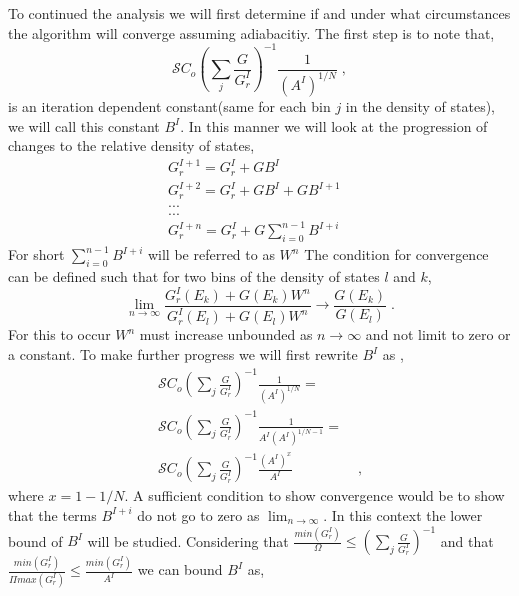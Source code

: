 \documentclass[aps,pre,reprint,superscriptaddress,showkeys]{revtex4-1}
\begin{document}
To continued the analysis we will first determine if and under what circumstances the algorithm will converge assuming adiabacitiy. The first step is to note that, 
\begin{equation}
\mathcal{S}{C_o}(\sum_{j}\frac{G}{G_r^I})^{-1}\frac{1}{(A^I)^{1/N}} \;,
\end{equation}
is an iteration dependent constant(same  for each bin $j$ in the density of states), we will call this constant $B^I$. In this manner we will look at the progression of changes to the relative density of states, 
\begin{equation}
\begin{split}
G_r^{I+1} = G_r^{I} + GB^I\\
G_r^{I+2} = G_r^{I} + GB^I + GB^{I+1} &\\
...&\\
...&\\
G_r^{I+n} = G_r^{I} + G\sum_{i=0}^{n-1}  B^{I+i} &
\end{split}
\label{Gr_IplusN}
\end{equation}
For short $\sum_{i=0}^{n-1}  B^{I+i}$ will be referred to as $W^n$
The condition for convergence can be defined such that for two bins of the density of states $l$ and $k$, 
\begin{equation}
\lim_{n\rightarrow \infty} \frac{G_r^{I}(E_k) + G(E_k)W^n}{G_r^{I}(E_l) + G(E_l)W^n} \rightarrow \frac{G(E_k)}{G(E_l)}\;.
\end{equation}
For this to occur $W^n$ must increase unbounded as $n\rightarrow \infty$ and not limit to zero or a constant. To make further progress we will first rewrite $B^I$ as , 
\begin{equation}
\begin{split}
\mathcal{S}{C_o}(\sum_{j}\frac{G}{G_r^{I}})^{-1}\frac{1}{(A^I)^{1/N}} = \\
\mathcal{S}{C_o}(\sum_{j}\frac{G}{G_r^{I}})^{-1}\frac{1}{A^I(A^I)^{1/N - 1}} = & \\
\mathcal{S}{C_o}(\sum_{j}\frac{G}{G_r^{I}})^{-1}\frac{(A^I)^{x}}{A^I} & \;,
\end{split}
\end{equation}
where $x = 1 - 1/N$. A sufficient condition to show convergence would be to show that the terms $B^{I+i}$ do not go to zero as $\lim_{n \rightarrow \infty}$. In this context the lower bound of $B^I$ will be studied. Considering that $ \frac{min(G_r^{I})}{\Omega} \le (\sum_{j}\frac{G}{G_r^{I}})^{-1}$ and that $\frac{min(G_r^{I})}{\Pi max(G_r^{I})} \le \frac{min(G_r^{I})}{A^I}$ we can bound $B^I$ as, 
\end{document}
